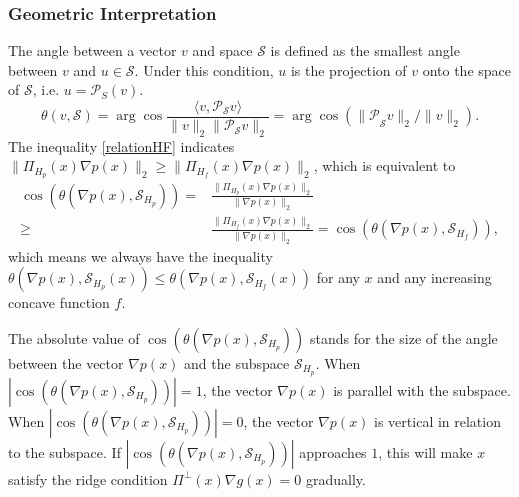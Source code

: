 \documentclass[aos,preprint]{imsart}
\theoremstyle{remark}
\begin{document}
\subsubsection{Geometric Interpretation}
The angle between a vector $v$ and space $\mathcal S$ is defined as the smallest angle between $v$ and $u \in \mathcal S$. Under this condition, $u$ is the projection of $v$ onto the space of $\mathcal S$, i.e. $u = {\mathcal P_S}(v)$. 
\[
\theta(v, {\mathcal S}) = \arg \cos \frac{\langle v, {\mathcal P}_{\mathcal S} v\rangle }{\|v\|_2 \|{\mathcal P}_{\mathcal S} v\|_2} =   \arg \cos( {\|\mathcal P}_{\mathcal S} v\|_2 / \|v\|_2 ).
\]
 The inequality \eqref{relationHF} indicates $\| \Pi_{H_p}(x) \nabla p(x)\|_2 \geq  \|\Pi_{H_f}(x) \nabla p(x)\|_2$, which is equivalent to 
 \[
 \begin{aligned}
\cos( \theta(\nabla p(x), {\mathcal S}_{H_p})) =& \frac{\| \Pi_{H_p}(x) \nabla p(x)\|_2}{\|\nabla p(x)\|_2} \\
\geq & \frac{\|\Pi_{H_f}(x) \nabla p(x)\|_2}{\|\nabla p(x)\|_2} = \cos(\theta(\nabla p(x), {\mathcal S}_{H_f})),
\end{aligned}
 \]
 which means we always have the inequality $\theta(\nabla p(x), {\mathcal S}_{H_p}(x)) \leq \theta(\nabla p(x), {\mathcal S}_{H_f}(x))$ for any $x$ and any increasing concave function $f$. 
 
 The absolute value of $\cos( \theta(\nabla p(x), {\mathcal S}_{H_p}))$ stands for the size of the angle between the vector $\nabla p(x)$ and the subspace ${\mathcal S}_{H_p}$. When $|\cos( \theta(\nabla p(x), {\mathcal S}_{H_p}))|=1$, the vector $\nabla p(x)$ is parallel with the subspace. When $|\cos( \theta(\nabla p(x), {\mathcal S}_{H_p}))|=0$, the vector $\nabla p(x)$ is vertical in relation to the subspace. If $|\cos( \theta(\nabla p(x), {\mathcal S}_{H_p}))|$ approaches $1$, this will make $x$ satisfy the ridge condition $\Pi^{\perp}(x)\nabla g(x)=0$ gradually.
\end{document}
